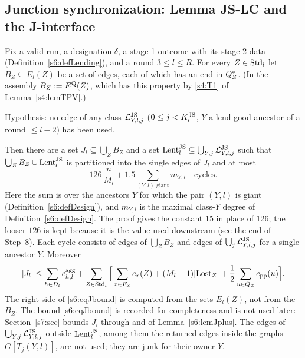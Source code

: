 \subsection{Junction synchronization: Lemma JS-LC and the J-interface}

\begin{lemma}\label{s6:lemJSLC}
Fix a valid run, a designation $\delta$, a stage-1 outcome with its stage-2 data (Definition~\ref{s6:defLending}), and a round $3\le l\le R$. For every $Z\in\mathrm{Std}_l$ let $B_Z\subseteq E_l(Z)$ be a set of edges, each of which has an end in $Q^{*}_Z$. (In the assembly $B_Z:=E^{\mathrm{Q}}(Z)$, which has this property by \ref{s4:T1} of Lemma~\ref{s4:lemTPV}.)

Hypothesis: no edge of any class $\mathcal{L}^{\mathrm{JS}}_{Y,l,j}$ ($0\le j<K^{\mathrm{JS}}_l$, $Y$ a lend-good ancestor of a round $\le l-2$) has been used.

Then there are a set $J_l\subseteq\bigcup_ZB_Z$ and a set $\mathrm{Lent}^{\mathrm{JS}}_l\subseteq\bigcup_{Y,j}\mathcal{L}^{\mathrm{JS}}_{Y,l,j}$ such that $\bigcup_ZB_Z\cup\mathrm{Lent}^{\mathrm{JS}}_l$ is partitioned into the single edges of $J_l$ and at most
\[
126\,\frac n{M_l}+1.5\sum_{(Y,l)\text{ giant}}m_{Y,l}\quad\text{cycles}.
\]
Here the sum is over the ancestors $Y$ for which the pair $(Y,l)$ is giant (Definition~\ref{s6:defDesign}), and $m_{Y,l}$ is the maximal class-$Y$ degree of Definition~\ref{s6:defDesign}. The proof gives the constant $15$ in place of $126$; the looser $126$ is kept because it is the value used downstream (see the end of Step~8). Each cycle consists of edges of $\bigcup_ZB_Z$ and edges of $\bigcup_j\mathcal{L}^{\mathrm{JS}}_{Y,l,j}$ for a single ancestor $Y$. Moreover
\begin{equation}\label{s6:eqJbound}
|J_l|\le\sum_{h\in D_l}c^{\mathrm{agg}}_{h,l}+\sum_{Z\in\mathrm{Std}_l}\Big[\sum_{x\in F_Z}c_x(Z)+(M_l-1)|\mathrm{Lost}_Z|+\frac12\sum_{u\in Q_Z}c_{\mathrm{pp}}(u)\Big].
\end{equation}
The right side of \eqref{s6:eqJbound} is computed from the sets $E_l(Z)$, not from the $B_Z$. The bound \eqref{s6:eqJbound} is recorded for completeness and is not used later: Section~\ref{s7:sec} bounds $J_l$ through  and  of Lemma~\ref{s6:lemJplus}. The edges of $\bigcup_{Y,j}\mathcal{L}^{\mathrm{JS}}_{Y,l,j}$ outside $\mathrm{Lent}^{\mathrm{JS}}_l$, among them the returned edges inside the graphs $G[T_j(Y,l)]$, are not used; they are junk for their owner $Y$.
\deps{\ref{s6:lemPAR}, \ref{s6:lemMED}, \ref{s6:lemEQLPT}, \ref{s6:lemHCCP}, \ref{s6:lemHCCglob}, \ref{s6:defDesign}, \ref{s6:defLending}, \ref{s3:lemCOL}, \ref{s3:lemMonotone}, \ref{s2:lemEL}, \ref{s2:lemCap}, \ref{s2:propOV}, \ref{s2:lemTower}, \ref{s2:defHBtp}, \ref{s2:propStructure}, \ref{s3:defCOL}, \ref{s1:citDef7}}
\end{lemma}

